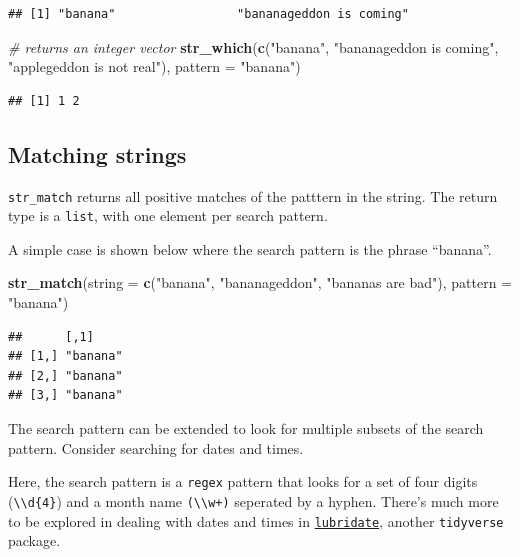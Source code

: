 \documentclass[]{book}
\newenvironment{Shaded}{}{}
\newcommand{\CommentTok}[1]{\textcolor[rgb]{0.38,0.63,0.69}{\textit{#1}}}
\newcommand{\DataTypeTok}[1]{\textcolor[rgb]{0.56,0.13,0.00}{#1}}
\newcommand{\KeywordTok}[1]{\textcolor[rgb]{0.00,0.44,0.13}{\textbf{#1}}}
\newcommand{\NormalTok}[1]{#1}
\newcommand{\StringTok}[1]{\textcolor[rgb]{0.25,0.44,0.63}{#1}}
\begin{document}
\begin{verbatim}
## [1] "banana"                 "bananageddon is coming"
\end{verbatim}

\begin{Shaded}
\begin{Highlighting}[]
\CommentTok{# returns an integer vector}
\KeywordTok{str_which}\NormalTok{(}\KeywordTok{c}\NormalTok{(}\StringTok{"banana"}\NormalTok{,}
            \StringTok{"bananageddon is coming"}\NormalTok{,}
            \StringTok{"applegeddon is not real"}\NormalTok{),}
          \DataTypeTok{pattern =} \StringTok{"banana"}\NormalTok{)}
\end{Highlighting}
\end{Shaded}

\begin{verbatim}
## [1] 1 2
\end{verbatim}

\hypertarget{matching-strings}{%
\subsection{Matching strings}\label{matching-strings}}

\texttt{str\_match} returns all positive matches of the patttern in the string.
The return type is a \texttt{list}, with one element per search pattern.

A simple case is shown below where the search pattern is the phrase ``banana''.

\begin{Shaded}
\begin{Highlighting}[]
\KeywordTok{str_match}\NormalTok{(}\DataTypeTok{string =} \KeywordTok{c}\NormalTok{(}\StringTok{"banana"}\NormalTok{,}
                     \StringTok{"bananageddon"}\NormalTok{,}
                     \StringTok{"bananas are bad"}\NormalTok{),}
          \DataTypeTok{pattern =} \StringTok{"banana"}\NormalTok{)}
\end{Highlighting}
\end{Shaded}

\begin{verbatim}
##      [,1]    
## [1,] "banana"
## [2,] "banana"
## [3,] "banana"
\end{verbatim}

The search pattern can be extended to look for multiple subsets of the search pattern. Consider searching for dates and times.

Here, the search pattern is a \texttt{regex} pattern that looks for a set of four digits (\texttt{\textbackslash{}\textbackslash{}d\{4\}}) and a month name \texttt{(\textbackslash{}\textbackslash{}w+)} seperated by a hyphen. There's much more to be explored in dealing with dates and times in \href{https://lubridate.tidyverse.org/}{\texttt{lubridate}}, another \texttt{tidyverse} package.
\end{document}
